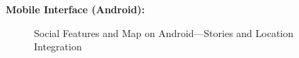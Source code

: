 \textbf{Mobile Interface (Android):}
\begin{figure}[!htbp]
    \centering
    \hspace{0.05\textwidth}
    \caption{Social Features and Map on Android---Stories and Location Integration}\label{fig:android_social_map}
\end{figure}

